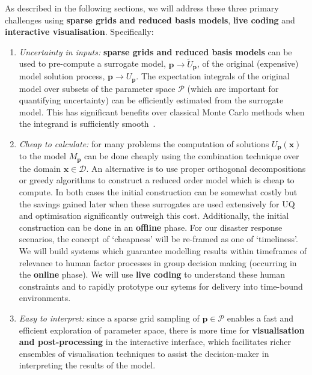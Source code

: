 As described in the following sections, we will address these {three primary challenges} using {\bf sparse grids and reduced basis models}, {\bf live coding} and {\bf interactive visualisation}. Specifically: 
\begin{enumerate}
\item \emph{Uncertainty in inputs:} {\bf sparse grids and reduced basis models} can be used
  to pre-compute a surrogate model, $\mathbf{p} \rightarrow \tilde{U}_{\mathbf{p}}$, of the original
  (expensive) model solution process, $\mathbf{p} \rightarrow {U}_{\mathbf{p}}$.
  The expectation integrals of the original model over subsets of the
  parameter space $\mathcal{P}$ (which are important for quantifying
  uncertainty) can be efficiently estimated from the
  surrogate model. This has
  significant benefits over classical Monte Carlo methods when the
  integrand is sufficiently
  smooth~\parencite{JakemanRoberts2013,FranzelinDiehlPfluger2014}.

\item \emph{Cheap to calculate:} for many problems the computation
  of solutions $U_{\mathbf{p}}(\mathbf{x})$ to the model
  $M_{\mathbf{p}}$ can be done cheaply using the combination technique
  over the domain $\mathbf{x}\in\mathcal{D}$. An alternative is to use
  proper orthogonal decompositions or greedy algorithms to construct a
  reduced order model which is cheap to compute. In both
  cases the initial construction can be somewhat costly but the
  savings gained later when these surrogates are used extensively for
  UQ and optimisation significantly outweigh this cost. Additionally,
  the initial construction can be done in an {\bf offline} phase. For our
  disaster response scenarios, the concept of `cheapness' will be
  re-framed as one of `timeliness'. We will build systems which
  guarantee modelling results within timeframes of
  relevance to human factor processes in group decision making
  (occurring in the {\bf online} phase). We will use {\bf live coding} to understand these human
  constraints and to rapidly prototype our sytems for delivery into time-bound environments.   

\item \emph{Easy to interpret:} since a sparse grid sampling of
  $\mathbf{p}\in\mathcal{P}$ enables a fast and efficient exploration
  of parameter space, there is more time for {\bf visualisation and
  post-processing} in the interactive interface, which facilitates
  richer ensembles of visualisation techniques to assist the
  decision-maker in interpreting the results of the model.
\end{enumerate}

